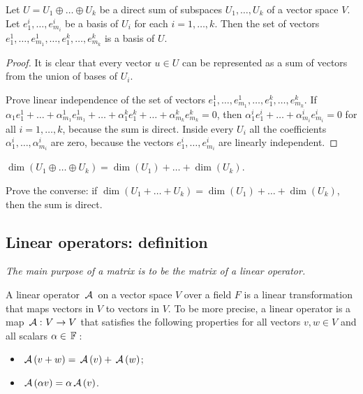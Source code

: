 \begin{lemma}
Let $U = U_1 \oplus \dots \oplus U_k$ be a direct sum of subspaces $U_1, \ldots, U_k$ of a vector space $V$. Let $e_1^i, \dots, e_{m_i}^i$ be a basis of $U_i$ for each $i = 1, \ldots, k$. Then the set of vectors $e_1^1, \dots, e_{m_1}^1, \dots, e_1^k, \dots, e_{m_k}^k$ is a basis of $U$.
\end{lemma}

\begin{proof}
It is clear that every vector $u \in U$ can be represented as a sum of vectors from the union of bases of $U_i$. 

Prove linear independence of the set of vectors $e_1^1, \dots, e_{m_1}^1, \dots, e_1^k, \dots, e_{m_k}^k$. If $\alpha_1 e_1^1 + \dots + \alpha_{m_1}^1 e_{m_1}^1 + \dots + \alpha_1^k e_1^k + \dots + \alpha_{m_k}^k e_{m_k}^k = 0$, then $\alpha_1^i e_1^i + \dots + \alpha_{m_i}^i e_{m_i}^i = 0$ for all $i = 1, \ldots, k$, because the sum is direct. Inside every $U_i$ all the coefficients $\alpha_1^i, \dots, \alpha_{m_i}^i$ are zero, because the vectors $e_1^i, \dots, e_{m_i}^i$ are linearly independent.
\end{proof}

\begin{corollary}
    $\dim(U_1 \oplus \dots \oplus U_k) = \dim(U_1) + \dots + \dim(U_k)$.
\end{corollary}

\begin{exercise}
    Prove the converse: if $\dim(U_1 + \dots + U_k) = \dim(U_1) + \dots + \dim(U_k)$, then the sum is direct.
\end{exercise}

\subsection{Linear operators: definition}

\begin{flushright}
    \emph{The main purpose of a matrix is to be the matrix of a linear operator.}
\end{flushright}

\begin{definition}
A linear operator $\,\mathcal{A}\,$ on a vector space $V$ over a field $F$ is a linear transformation that maps vectors in $V$ to vectors in $V$. 
To be more precise, a linear operator is a map  $\,\mathcal{A}\,\colon V \to V$ that satisfies the following properties for all vectors $v, w \in V$ and all scalars $\alpha \in \,\mathbb{F}\,$:
\begin{itemize}
    \item $\,\mathcal{A}\,(v + w) = \,\mathcal{A}\,(v) + \,\mathcal{A}\,(w)$;
    \item $\,\mathcal{A}\,(\alpha v) = \alpha \,\mathcal{A}\,(v)$.
\end{itemize}
\end{definition}

